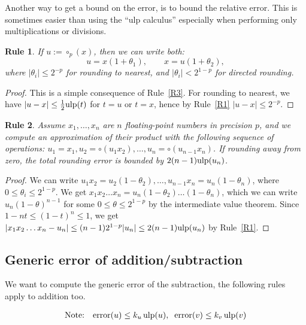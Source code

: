 \documentclass[12pt]{amsart}
\def\ulp{{\rm ulp}}
\DeclareMathOperator{\error}{error}
\newtheorem{Rule}{Rule}
\begin{document}
Another way to get a bound on the error,
is to bound the relative error. This is sometimes easier than using the
``ulp calculus'' especially when performing only multiplications or divisions.

\begin{Rule} \label{R10}
If $u := \circ_p(x)$, then we can write both:
\[ u = x (1 + \theta_1), \qquad x = u (1 + \theta_2), \]
where $|\theta_i| \leq 2^{-p}$ for rounding to nearest, and
$|\theta_i| < 2^{1-p}$ for directed rounding.
\end{Rule}
\begin{proof}
This is a simple consequence of Rule~\ref{R3}. For rounding to nearest,
we have $|u-x| \leq \frac{1}{2} \ulp(t)$ for $t=u$ or $t=x$, hence by
Rule~\ref{R1} $|u-x| \leq 2^{-p}$.
\end{proof}

\begin{Rule} \label{R11}
Assume $x_1, \ldots, x_n$ are $n$ floating-point numbers in precision $p$,
and we compute an approximation of their product with the following sequence
of operations: $u_1 = x_1, u_2 = \circ(u_1 x_2), \ldots, u_n = \circ(u_{n-1}
x_n)$. If rounding away from zero, the total rounding error is bounded by
$2(n-1) \ulp(u_n)$.
\end{Rule}
\begin{proof}
We can write $u_1 x_2 = u_2 (1 - \theta_2), \ldots, u_{n-1} x_n = u_n
(1 - \theta_n)$, where $0 \leq \theta_i \leq 2^{1-p}$.
We get $x_1 x_2 \ldots x_n = u_n (1 - \theta_2) \ldots (1 - \theta_n)$,
which we can write $u_n (1-\theta)^{n-1}$ for some $0 \leq \theta \leq 2^{1-p}$
by the intermediate value theorem.
Since $1-nt \leq (1-t)^n \leq 1$, we get $|x_1 x_2 \ldots x_n - u_n| \leq
(n-1) 2^{1-p} |u_n| \leq 2 (n-1) \ulp(u_n)$ by Rule~\ref{R1}.
\end{proof}


\subsection{Generic error of addition/subtraction}\label{generic:sous}

We want to compute the generic error of the subtraction, the following rules
apply to addition too.

\begin{eqnarray}\nonumber
\textnormal{Note:}&& \error(u) \leq k_u \, \ulp(u), \;\; \error(v) \leq k_v \, \ulp(v)
\end{eqnarray}
\end{document}
